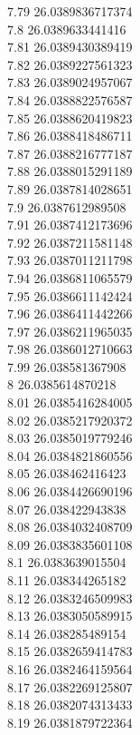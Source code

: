 {7.79	26.0389836717374\\
7.8	26.0389633441416\\
7.81	26.0389430389419\\
7.82	26.0389227561323\\
7.83	26.0389024957067\\
7.84	26.0388822576587\\
7.85	26.0388620419823\\
7.86	26.0388418486711\\
7.87	26.0388216777187\\
7.88	26.0388015291189\\
7.89	26.0387814028651\\
7.9	26.0387612989508\\
7.91	26.0387412173696\\
7.92	26.0387211581148\\
7.93	26.0387011211798\\
7.94	26.0386811065579\\
7.95	26.0386611142424\\
7.96	26.0386411442266\\
7.97	26.0386211965035\\
7.98	26.0386012710663\\
7.99	26.038581367908\\
8	26.0385614870218\\
8.01	26.0385416284005\\
8.02	26.0385217920372\\
8.03	26.0385019779246\\
8.04	26.0384821860556\\
8.05	26.038462416423\\
8.06	26.0384426690196\\
8.07	26.038422943838\\
8.08	26.0384032408709\\
8.09	26.0383835601108\\
8.1	26.0383639015504\\
8.11	26.038344265182\\
8.12	26.0383246509983\\
8.13	26.0383050589915\\
8.14	26.038285489154\\
8.15	26.0382659414783\\
8.16	26.0382464159564\\
8.17	26.0382269125807\\
8.18	26.0382074313433\\
8.19	26.0381879722364\\
}
